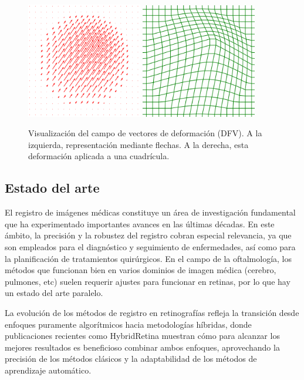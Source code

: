 \begin{figure}[tbp]
    \centering
    \includegraphics[width=0.45\textwidth]{imaxes/dfv_arrows.png}
    \includegraphics[width=0.45\textwidth]{imaxes/dfv_grid.png}
    \caption{Visualización del campo de vectores de deformación (DFV). A la izquierda, representación mediante flechas. A la derecha, esta deformación aplicada a una cuadrícula.}
    \label{fig:dfv_visualization}
\end{figure}

\subsection{Estado del arte}
\label{subsec:Estado del arte}

El registro de imágenes médicas constituye un área de investigación fundamental que ha experimentado importantes avances en las últimas décadas. En este ámbito, la precisión y la robustez del registro cobran especial relevancia, ya que son empleados para el diagnóstico y seguimiento de enfermedades, así como para la planificación de tratamientos quirúrgicos.
En el campo de la oftalmología, los métodos que funcionan bien en varios dominios de imagen médica (cerebro, pulmones, etc) suelen requerir ajustes para funcionar en retinas, por lo que hay un estado del arte paralelo.

La evolución de los métodos de registro en retinografías refleja la transición desde enfoques puramente algorítmicos hacia metodologías híbridas, donde publicaciones recientes como HybridRetina \cite{liu2024progressiveretinalimageregistration} muestran cómo para alcanzar los mejores resultados es beneficioso combinar ambos enfoques, aprovechando la precisión de los métodos clásicos y la adaptabilidad de los métodos de aprendizaje automático.

